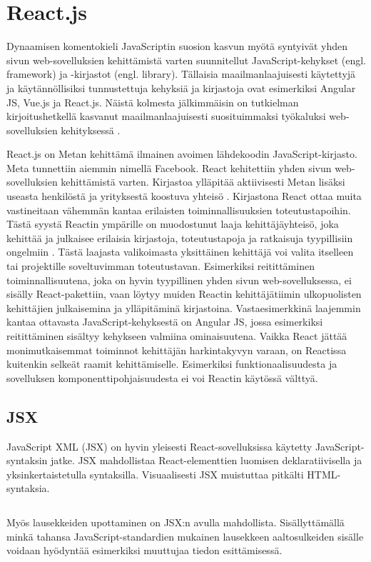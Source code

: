 \chapter{React.js} \label{reactjs}
Dynaamisen komentokieli JavaScriptin suosion kasvun myötä syntyivät yhden sivun web-sovelluksien kehittämistä varten suunnitellut JavaScript-kehykset (engl. framework) ja -kirjastot (engl. library). Tällaisia maailmanlaajuisesti käytettyjä ja käytännöllisiksi tunnustettuja kehyksiä ja kirjastoja ovat esimerkiksi Angular JS, Vue.js ja React.js. Näistä kolmesta jälkimmäisin on tutkielman kirjoitushetkellä kasvanut maailmanlaajuisesti suosituimmaksi työkaluksi web-sovelluksien kehityksessä \cite{stackoverflowsurvey}.

React.js on Metan kehittämä ilmainen avoimen lähdekoodin JavaScript-kirjasto. Meta tunnettiin aiemmin nimellä Facebook. React kehitettiin yhden sivun web-sovelluksien kehittämistä varten. Kirjastoa ylläpitää aktiivisesti Metan lisäksi useasta henkilöstä ja yrityksestä koostuva yhteisö \cite{reactdocsteam}. Kirjastona React ottaa muita vastineitaan vähemmän kantaa erilaisten toiminnallisuuksien toteutustapoihin. Tästä syystä Reactin ympärille on muodostunut laaja kehittäjäyhteisö, joka kehittää ja julkaisee erilaisia kirjastoja, toteutustapoja ja ratkaisuja tyypillisiin ongelmiin \cite{rawatmahajan}. Tästä laajasta valikoimasta yksittäinen kehittäjä voi valita itselleen tai projektille soveltuvimman toteutustavan. Esimerkiksi reitittäminen toiminnallisuutena, joka on hyvin tyypillinen yhden sivun web-sovelluksessa, ei sisälly React-pakettiin, vaan löytyy muiden Reactin kehittäjätiimin ulkopuolisten kehittäjien julkaisemina ja ylläpitäminä kirjastoina. Vastaesimerkkinä laajemmin kantaa ottavasta JavaScript-kehyksestä on Angular JS, jossa esimerkiksi reitittäminen sisältyy kehykseen valmiina ominaisuutena. Vaikka React jättää monimutkaisemmat toiminnot kehittäjän harkintakyvyn varaan, on Reactissa kuitenkin selkeät raamit kehittämiselle. Esimerkiksi funktionaalisuudesta ja sovelluksen komponenttipohjaisuudesta ei voi Reactin käytössä välttyä.


\section{JSX}
\label{JSX}

JavaScript XML (JSX) on hyvin yleisesti React-sovelluksissa käytetty JavaScript-syntaksin jatke. JSX mahdollistaa React-elementtien luomisen deklaratiivisella ja yksinkertaistetulla syntaksilla. Visuaalisesti JSX muistuttaa pitkälti HTML-syntaksia.
\inputminted[bgcolor=black]{jsx.py:JsxLexer -x}{listaukset/jsx.js}
Myös lausekkeiden upottaminen on JSX:n avulla mahdollista. Sisällyttämällä minkä tahansa JavaScript-standardien mukainen lausekkeen aaltosulkeiden sisälle voidaan hyödyntää esimerkiksi muuttujaa tiedon esittämisessä. \cite{reactdocsjsx}
\inputminted[bgcolor=black]{jsx.py:JsxLexer -x}{listaukset/jsxexpression.js}

